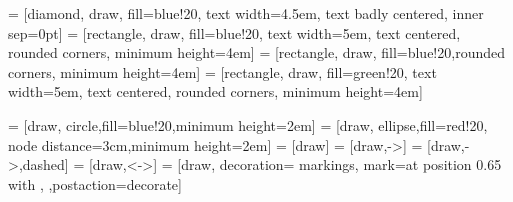 
\newcommand{\vect}[1]{\overrightarrow{#1}}
\newcommand{\cross}[0]{\times}
\newcommand{\matt}[1]{\boldsymbol{#1}}
\newcommand{\transpose}{^T}
\newcommand{\unit}[1]{\, \mathrm{#1}}

\newcommand{\future}[1]{{\color{red}\itshape#1}}

{%
  \inheritsavedanchors[from={rectangle}]%
  \inheritanchorborder[from={rectangle}]%
}

\tikzset{>=latex}
 = [diamond, draw, fill=blue!20, text width=4.5em, text badly centered, inner sep=0pt]
 = [rectangle, draw, fill=blue!20, text width=5em, text centered, rounded corners, minimum height=4em]
 = [rectangle, draw, fill=blue!20,rounded corners, minimum height=4em]
 = [rectangle, draw, fill=green!20, text width=5em, text centered, rounded corners, minimum height=4em]

 = [draw, circle,fill=blue!20,minimum height=2em]
 = [draw, ellipse,fill=red!20, node distance=3cm,minimum height=2em]
 = [draw]
 = [draw,->]
 = [draw,->,dashed]
 = [draw,<->]
 = [draw,%
          decoration={%
            markings,%
            mark=at position 0.65 with {},
          },postaction=decorate]
          
